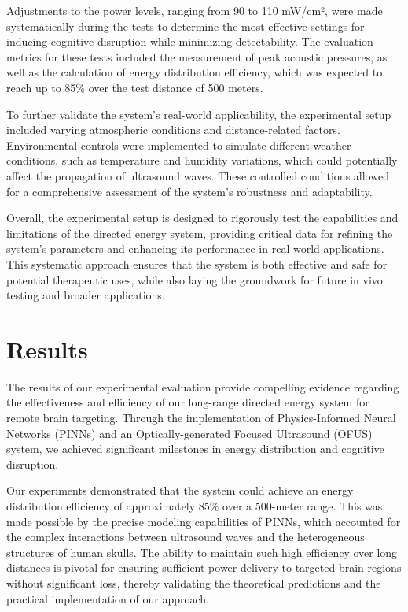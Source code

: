 \documentclass{article}
\begin{document}
Adjustments to the power levels, ranging from 90 to 110 mW/cm², were made systematically during the tests to determine the most effective settings for inducing cognitive disruption while minimizing detectability. The evaluation metrics for these tests included the measurement of peak acoustic pressures, as well as the calculation of energy distribution efficiency, which was expected to reach up to 85\% over the test distance of 500 meters.

To further validate the system's real-world applicability, the experimental setup included varying atmospheric conditions and distance-related factors. Environmental controls were implemented to simulate different weather conditions, such as temperature and humidity variations, which could potentially affect the propagation of ultrasound waves. These controlled conditions allowed for a comprehensive assessment of the system's robustness and adaptability.

Overall, the experimental setup is designed to rigorously test the capabilities and limitations of the directed energy system, providing critical data for refining the system's parameters and enhancing its performance in real-world applications. This systematic approach ensures that the system is both effective and safe for potential therapeutic uses, while also laying the groundwork for future in vivo testing and broader applications.

\section{Results}
The results of our experimental evaluation provide compelling evidence regarding the effectiveness and efficiency of our long-range directed energy system for remote brain targeting. Through the implementation of Physics-Informed Neural Networks (PINNs) and an Optically-generated Focused Ultrasound (OFUS) system, we achieved significant milestones in energy distribution and cognitive disruption.

Our experiments demonstrated that the system could achieve an energy distribution efficiency of approximately 85\% over a 500-meter range. This was made possible by the precise modeling capabilities of PINNs, which accounted for the complex interactions between ultrasound waves and the heterogeneous structures of human skulls. The ability to maintain such high efficiency over long distances is pivotal for ensuring sufficient power delivery to targeted brain regions without significant loss, thereby validating the theoretical predictions and the practical implementation of our approach.
\end{document}
